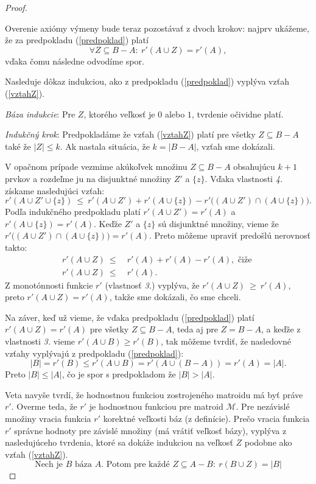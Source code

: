 \begin{proof}
\begin{enumerate}
		\medskip
		Overenie axiómy výmeny bude teraz pozostávať z dvoch krokov: najprv ukážeme, že za predpokladu (\ref{predpoklad}) platí
		\begin{equation}
			\label{vztahZ}
			\forall Z \subseteq B{-}A:~ r'( A \cup Z ) = r'(A),
		\end{equation}
		vďaka čomu následne odvodíme spor.


		Nasleduje dôkaz indukciou, ako z predpokladu (\ref{predpoklad}) vyplýva vzťah (\ref{vztahZ}).

		{\it Báza indukcie}:
			Pre $Z$, ktorého veľkosť je $0$ alebo $1$, tvrdenie očividne platí.

		{\it Indukčný krok}:
			Predpokladáme že vzťah (\ref{vztahZ}) platí pre všetky $Z \subseteq B{-}A$  také že $|Z| \le k$. Ak nastala situácia, že $k=|B{-}A|$, vzťah sme dokázali.

			V opačnom prípade vezmime akúkoľvek množinu $Z \subseteq B{-}A$ obsahujúcu $k+1$ prvkov a rozdeľme ju na disjunktné množiny $Z'$ a $\{z\}$. Vďaka vlastnosti {\it 4.} získame nasledujúci vzťah:
			$$ r'(A \cup Z' \cup \{z\})  ~\le~  r'(A \cup Z') + r'(A \cup \{z\}) - r'\big((A \cup Z') \cap (A \cup \{z\})\big). $$
			Podľa indukčného predpokladu platí $r'(A \cup Z') = r'(A)$ a $r'(A \cup \{z\}) = r'(A)$. Keďže $Z'$ a $\{z\}$ sú disjunktné množiny, vieme že $r'\big((A \cup Z') \cap (A \cup \{z\})\big) = r'(A)$. Preto môžeme upraviť predošlú nerovnosť takto:
			\begin{align*}
			r'(A \cup Z ) ~\le&~ r'(A) + r'(A) - r'(A), \text{ čiže }\\
			r'(A \cup Z ) ~\le&~ r'(A).
			\end{align*}
			Z monotónnosti funkcie $r'$ (vlastnosť {\it 3.}) vyplýva, že $r'(A \cup Z ) ~\ge~ r'(A)$, preto $r'(A \cup Z ) = r'(A)$, takže sme dokázali, čo sme chceli.


		\medskip
		Na záver, keď už vieme, že vďaka predpokladu (\ref{predpoklad}) platí $r'( A \cup Z ) = r'(A)$ pre všetky $Z \subseteq B{-}A$, teda aj pre $Z=B{-}A$, a keďže z vlastnosti {\it 3.} vieme $r'(A \cup B) \ge r'(B)$, tak môžeme tvrdiť, že nasledovné vzťahy vyplývajú z predpokladu (\ref{predpoklad}):
		$$ |B| = r'(B) \le r'(A \cup B) = r'(A \cup (B{-}A)) = r'(A) = |A|. $$
		Preto $|B| \le |A|$, čo je spor s predpokladom že $|B| > |A|$.

	\end{enumerate}

	\medskip
	Veta navyše tvrdí, že hodnostnou funkciou zostrojeného matroidu má byť práve $r'$. Overme teda, že $r'$ je hodnostnou funkciou pre matroid $\mathcal{M}$. Pre nezávislé množiny vracia funkcia $r'$ korektné veľkosti báz (z definície). Prečo vracia funkcia $r'$ správne hodnoty pre závislé množiny (má vrátiť veľkosť bázy), vyplýva z nasledujúceho tvrdenia, ktoré sa dokáže indukciou na veľkosť $Z$ podobne ako vzťah (\ref{vztahZ}).
	$$ \text{Nech je $B$ báza $A$. Potom pre každé } Z \subseteq A{-}B: ~ r(B \cup Z) = |B| $$


\end{proof}
